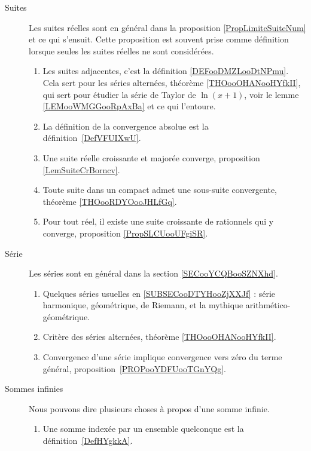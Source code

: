 
\begin{description}
    \item[Suites] 
        Les suites réelles sont en général dans la proposition \ref{PropLimiteSuiteNum} et ce qui s'ensuit. Cette proposition est souvent prise comme définition lorsque seules les suites réelles ne sont considérées.
        \begin{enumerate}
    \item
        Les suites adjacentes, c'est la définition \ref{DEFooDMZLooDtNPmu}. Cela sert pour les séries alternées, théorème \ref{THOooOHANooHYfkII}, qui sert pour étudier la série de Taylor de \( \ln(x+1)\), voir le lemme \ref{LEMooWMGGooRpAxBa} et ce qui l'entoure.
    \item
        La définition de la convergence absolue est la définition~\ref{DefVFUIXwU}.
            \item
                Une suite réelle croissante et majorée converge, proposition \ref{LemSuiteCrBorncv}.
            \item
                Toute suite dans un compact admet une sous-suite convergente, théorème \ref{THOooRDYOooJHLfGq}.
            \item
                Pour tout réel, il existe une suite croissante de rationnels qui y converge, proposition \ref{PropSLCUooUFgiSR}.
        \end{enumerate}
    \item[Série] 
        Les séries sont en général dans la section \ref{SECooYCQBooSZNXhd}.
        \begin{enumerate}
    \item
        Quelques séries usuelles en \ref{SUBSECooDTYHooZjXXJf} : série harmonique, géométrique, de Riemann, et la mythique arithmético-géométrique.
    \item
        Critère des séries alternées, théorème \ref{THOooOHANooHYfkII}.
    \item
        Convergence d'une série implique convergence vers zéro du terme général, proposition~\ref{PROPooYDFUooTGnYQg}.
        \end{enumerate}
    \item[Sommes infinies]
        Nous pouvons dire plusieurs choses à propos d'une somme infinie.%
        \begin{enumerate}
            \item
Une somme indexée par un ensemble quelconque est la définition~\ref{DefHYgkkA}.

\end{enumerate}
\end{description}
